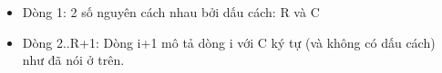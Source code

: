 \begin{itemize}
	\item     Dòng 1: 2 số nguyên cách nhau bởi dấu cách: R và C   
	\item     Dòng 2..R+1: Dòng i+1 mô tả dòng i với C ký tự (và không có dấu          cách) như đã nói ở trên.   
\end{itemize}

\